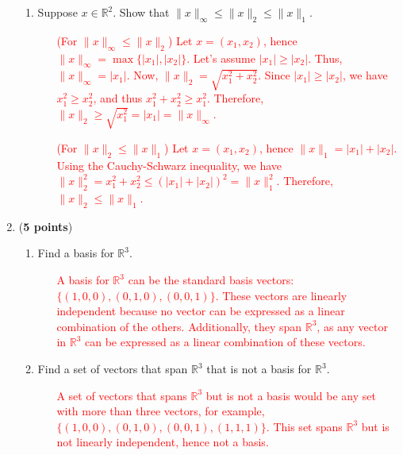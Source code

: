 \documentclass[11pt]{article}
\begin{document}
\begin{enumerate}
\begin{enumerate}
  \item Suppose $x \in \mathbb{R}^2$.  Show that $\| x \|_{\infty} \le \| x \|_2 \le \| x \|_1$.

    \begin{enumerate}
        \item[\textcolor{red}{(For $\|x\|_\infty \leq \|x\|_2$)}]
            \textcolor{red}{Let $x = (x_1, x_2)$, hence $\|x\|_\infty = \max\{|x_1|, |x_2|\}$. Let's assume $|x_1| \geq |x_2|$. Thus, $\|x\|_\infty = |x_1|$.} 
            \textcolor{red}{Now, $\|x\|_2 = \sqrt{x_1^2 + x_2^2}$. Since $|x_1| \geq |x_2|$, we have $x_1^2 \geq x_2^2$, and thus $x_1^2 + x_2^2 \geq x_1^2$. Therefore, $\|x\|_2 \geq \sqrt{x_1^2} = |x_1| = \|x\|_\infty$.} \\
        \item[\textcolor{red}{(For $\|x\|_2 \leq \|x\|_1$)}]
            \textcolor{red}{Let $x = (x_1, x_2)$, hence $\|x\|_1 = |x_1| + |x_2|$.}
            \textcolor{red}{Using the Cauchy-Schwarz inequality, we have $\|x\|_2^2 = x_1^2 + x_2^2 \leq (|x_1| + |x_2|)^2 = \|x\|_1^2$.}
            \textcolor{red}{Therefore, $\|x\|_2 \leq \|x\|_1$.}
    \end{enumerate}

  \end{enumerate}

  \item ({\bf 5 points})
  \begin{enumerate}
\item Find a basis for $\mathbb{R}^3$.
\\[-.25cm]
\begin{enumerate}
    \item[\textcolor{red}{}] \textcolor{red}{
    A basis for $\mathbb{R}^3$ can be the standard basis vectors: $\{(1, 0, 0), (0, 1, 0), (0, 0, 1)\}$. These vectors are linearly independent because no vector can be expressed as a linear combination of the others. Additionally, they span $\mathbb{R}^3$, as any vector in $\mathbb{R}^3$ can be expressed as a linear combination of these vectors.
    }
\end{enumerate}

\item Find a set of vectors that span $\mathbb{R}^3$ that is not a basis for $\mathbb{R}^3$.
\\[-.25cm]

\begin{enumerate}
    \item[\textcolor{red}{}] \textcolor{red}{A set of vectors that spans $\mathbb{R}^3$ but is not a basis would be any set with more than three vectors, for example, $\{(1, 0, 0), (0, 1, 0), (0, 0, 1), (1, 1, 1)\}$. This set spans $\mathbb{R}^3$ but is not linearly independent, hence not a basis.}
\end{enumerate}


\end{enumerate}
\end{enumerate}
\end{document}
